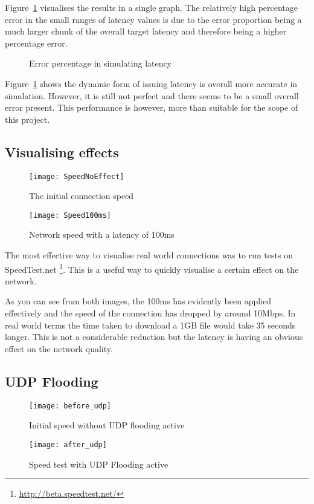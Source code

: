 Figure~\ref{ref:latencyAccuracy} visualises the results in a single graph. The relatively high percentage error in the small ranges of latency values is due to the error proportion being a much larger chunk of the overall target latency and therefore being a higher percentage error.

\begin{center}
	
	\begin{figure}[h]
		\caption{Error percentage in simulating latency}
		\label{ref:latencyAccuracy}
	\end{figure}
\end{center}


Figure~\ref{ref:latencyAccuracy} shows the dynamic form of issuing latency is overall more accurate in simulation. However, it is still not perfect and there seems to be a small overall error present. This performance is however, more than suitable for the scope of this project.

\subsection{Visualising effects}
\begin{wrapfigure}{r}{5cm}
\begin{center}
	\texttt{[image: SpeedNoEffect]}
	\caption{The initial connection speed}
	\texttt{[image: Speed100ms]}
	\caption{Network speed with a latency of 100ms}
\end{center}
\end{wrapfigure}

The most effective way to visualise real world connections was to run tests on SpeedTest.net \footnote{\url{http://beta.speedtest.net/}}. This is a useful way to quickly visualise a certain effect on the network.

As you can see from both images, the 100ms has evidently been applied effectively and the speed of the connection has dropped by around 10Mbps. In real world terms the time taken to download a 1GB file would take 35 seconds longer. This is not a considerable reduction but the latency is having an obvious effect on the network quality.


\subsection{UDP Flooding}
\begin{wrapfigure}{r}{5cm}
\begin{center}
	\texttt{[image: before\_udp]}
	\caption{Initial speed without UDP flooding active}
	\texttt{[image: after\_udp]}
	\caption{Speed test with UDP Flooding active}
\end{center}
\end{wrapfigure}

